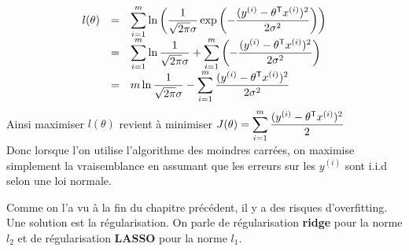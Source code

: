 $$ \begin{array}{lll}
	l(\theta)
	& = & \displaystyle \sum_{i = 1}^m \ln \left( \dfrac{1}{\sqrt{2 \pi} \sigma} \exp \left( - \dfrac{(y^{(i)} - \theta^{\mathsf{T}} x^{(i)})^2}{2 \sigma^2} \right) \right) \\
	& = & \displaystyle \sum_{i = 1}^m \ln \dfrac{1}{\sqrt{2 \pi} \sigma} + \sum_{i = 1}^m \left( - \dfrac{(y^{(i)} - \theta^{\mathsf{T}} x^{(i)})^2}{2 \sigma^2} \right) \\
	& = & \displaystyle m \ln \dfrac{1}{\sqrt{2 \pi} \sigma} - \sum_{i = 1}^m \dfrac{(y^{(i)} - \theta^{\mathsf{T}} x^{(i)})^2}{2 \sigma^2}
\end{array} $$
Ainsi maximiser $l(\theta)$ revient à minimiser $\displaystyle J(\theta) = \sum_{i = 1}^m \dfrac{(y^{(i)} - \theta^{\mathsf{T}} x^{(i)})^2}{2}$ \\
Donc lorsque l'on utilise l'algorithme des moindres carrées, on maximise simplement la vraisemblance en assumant que les erreurs sur les $y^{(i)}$ sont i.i.d selon une loi normale.


Comme on l'a vu à la fin du chapitre précédent, il y a des risques d'overfitting. Une solution est la régularisation. On parle de régularisation \textbf{ridge} pour la norme $l_2$ et de régularisation \textbf{LASSO} pour la norme $l_1$.

